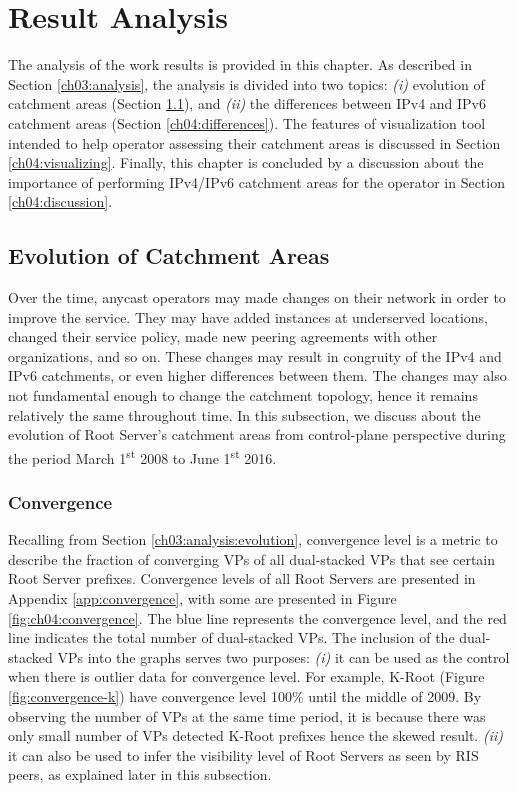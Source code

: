 \chapter{Result Analysis}
\label{ch04}
The analysis of the work results is provided in this chapter. As described in Section \ref{ch03:analysis}, the analysis is divided into two topics: \textit{(i)} evolution of catchment areas (Section \ref{ch04:evolution}), and \textit{(ii)} the differences between IPv4 and IPv6 catchment areas (Section \ref{ch04:differences}). The features of visualization tool intended to help operator assessing their catchment areas is discussed in Section \ref{ch04:visualizing}. Finally, this chapter is concluded by a discussion about the importance of performing IPv4/IPv6 catchment areas for the operator in Section \ref{ch04:discussion}.

\section{Evolution of Catchment Areas}
\label{ch04:evolution}
Over the time, anycast operators may made changes on their network in order to improve the service. They may have added instances at underserved locations, changed their service policy, made new peering agreements with other organizations, and so on. These changes may result in congruity of the IPv4 and IPv6 catchments, or even higher differences between them. The changes may also not fundamental enough to change the catchment topology, hence it remains relatively the same throughout time. In this subsection, we discuss about the evolution of Root Server's catchment areas from control-plane perspective during the period March 1\textsuperscript{st} 2008 to June 1\textsuperscript{st} 2016.

\subsection{Convergence}
\label{ch04:evolution:convergence}
Recalling from Section \ref{ch03:analysis:evolution}, convergence level is a metric to describe the fraction of converging VPs of all dual-stacked VPs that see certain Root Server prefixes. Convergence levels of all Root Servers are presented in Appendix \ref{app:convergence}, with some are presented in Figure \ref{fig:ch04:convergence}. The blue line represents the convergence level, and the red line indicates the total number of dual-stacked VPs. The inclusion of the dual-stacked VPs into the graphs serves two purposes: \textit{(i)} it can be used as the control when there is outlier data for convergence level. For example, K-Root (Figure \ref{fig:convergence-k}) have convergence level 100\% until the middle of 2009. By observing the number of VPs at the same time period, it is because there was only small number of VPs detected K-Root prefixes hence the skewed result. \textit{(ii)} it can also be used to infer the visibility level of Root Servers as seen by RIS peers, as explained later in this subsection. 

